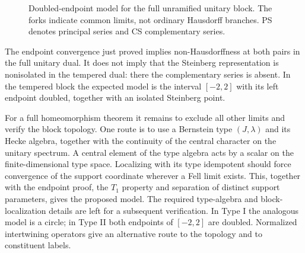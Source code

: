 \begin{figure}[htbp]\centering
{}
\caption{Doubled-endpoint model for the full unramified unitary block. The forks indicate common limits, not ordinary Hausdorff branches. PS denotes principal series and CS complementary series.}\label{fig:fell-model}
\end{figure}
The endpoint convergence just proved implies non-Hausdorffness at both pairs in the full unitary dual. It does not imply that the Steinberg representation is nonisolated in the tempered dual: there the complementary series is absent. In the tempered block the expected model is the interval $[-2,2]$ with its left endpoint doubled, together with an isolated Steinberg point.

\begin{remark}\label{rem:exact-fell}
For a full homeomorphism theorem it remains to exclude all other limits and verify the block topology. One route is to use a Bernstein type $(J,\lambda)$ and its Hecke algebra, together with the continuity of the central character on the unitary spectrum. A central element of the type algebra acts by a scalar on the finite-dimensional type space. Localizing with its type idempotent should force convergence of the support coordinate wherever a Fell limit exists. This, together with the endpoint proof, the $T_1$ property and separation of distinct support parameters, gives the proposed model. The required type-algebra and block-localization details are left for a subsequent verification. In Type I the analogous model is a circle; in Type II both endpoints of $[-2,2]$ are doubled. Normalized intertwining operators give an alternative route to the topology and to constituent labels.
\end{remark}

